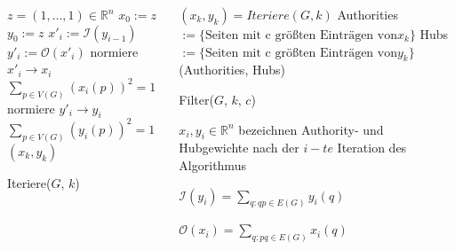 \documentclass[hyperref={pdfpagelabels=false}]{beamer}
\begin{document}
\begin{frame}


\begin{minipage}[0.2\textheight]{\textwidth}
	\begin{columns}[T]
		\begin{column}{0.5\textwidth}

			\begin{algorithm}[H]
				\begin{algorithmic}[1]
				\fontsize{11pt}{7.2}\selectfont
				\STATE $z = (1,\dots,1)\in{\mathbb{R}^n}$
				\STATE $x_0 := z$
				\STATE $y_0 := z$
					\STATE $x'_i:=\mathcal{I}(y_{i-1})$
					\STATE $y'_i:=\mathcal{O}(x'_{i})$
					\STATE normiere $x'_i \rightarrow x_i$\\
							$\sum_{p\in V(G)} (x_i(p))^2 = 1$
					\STATE normiere $y'_i \rightarrow y_i$\\
							$\sum_{p\in V(G)} (y_i(p))^2 = 1$
				\ENDFOR
				\RETURN $(x_k,y_k)$
				\end{algorithmic}
				\caption{Iteriere($G$, $k$)\cite{Kleinberg}}
			\end{algorithm}
		\end{column}
		
	\begin{column}{0.55\textwidth}
		\begin{algorithm}[H]
			\begin{algorithmic}[1]
			\fontsize{10pt}{7.2}\selectfont
			\STATE $(x_k,y_k) = Iteriere(G,k)$
			\STATE Authorities $:= \{\text{Seiten mit c größten Einträgen von} x_k\}$ 
			\STATE Hubs $:= \{\text{Seiten mit c größten Einträgen von} y_k\}$ 
			\RETURN (Authorities, Hubs)
			\end{algorithmic}
		\caption{Filter($G$, $k$, $c$)\cite{Kleinberg}}
		\end{algorithm}
		
		
		$x_i, y_i\in{\mathbb{R}^n}$ bezeichnen Authority- und Hubgewichte nach der $i-te$ Iteration des Algorithmus
		
		\centering
		\vspace{5pt}
		$\mathcal{I}(y_i) = \sum_{q:qp\in E(G)}y_i(q)$
		
		\vspace{3pt}
		$\mathcal{O}(x_i) = \sum_{q:pq\in E(G)}x_i(q)$
		
		

	\end{column}
	\end{columns}
\end{minipage}
\end{frame}
\end{document}
